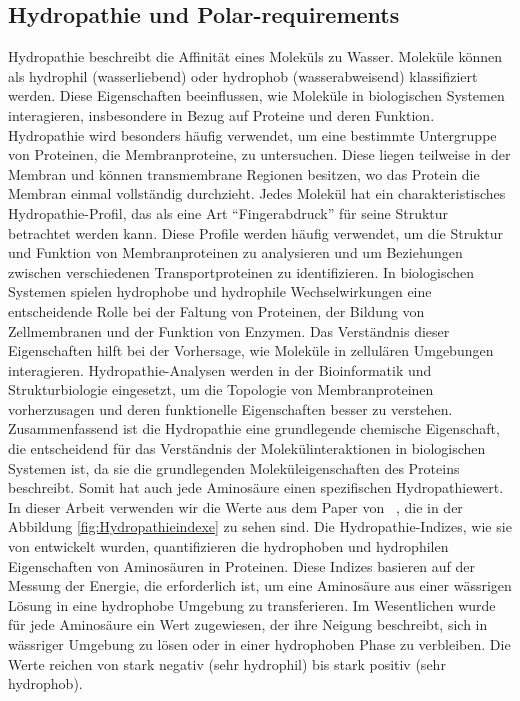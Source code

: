 \documentclass[german,version-2022-01]{uzl-thesis}
\begin{document}
\subsection{Hydropathie und Polar-requirements}
Hydropathie beschreibt die Affinit\"at eines Molek\"uls zu Wasser. Molek\"ule k\"onnen als hydrophil (wasserliebend) oder hydrophob (wasserabweisend) klassifiziert werden. Diese Eigenschaften beeinflussen, wie Molek\"ule in biologischen Systemen interagieren, insbesondere in Bezug auf Proteine und deren Funktion. Hydropathie wird besonders h\"aufig verwendet, um eine bestimmte Untergruppe von Proteinen, die Membranproteine, zu untersuchen. Diese liegen teilweise in der Membran und k\"onnen transmembrane Regionen besitzen, wo das Protein die Membran einmal vollst\"andig durchzieht. Jedes Molek\"ul hat ein charakteristisches Hydropathie-Profil, das als eine Art "`Fingerabdruck"' f\"ur seine Struktur betrachtet werden kann. Diese Profile werden h\"aufig verwendet, um die Struktur und Funktion von Membranproteinen zu analysieren und um Beziehungen zwischen verschiedenen Transportproteinen zu identifizieren. In biologischen Systemen spielen hydrophobe und hydrophile Wechselwirkungen eine entscheidende Rolle bei der Faltung von Proteinen, der Bildung von Zellmembranen und der Funktion von Enzymen. Das Verst\"andnis dieser Eigenschaften hilft bei der Vorhersage, wie Molek\"ule in zellul\"aren Umgebungen interagieren. Hydropathie-Analysen werden in der Bioinformatik und Strukturbiologie eingesetzt, um die Topologie von Membranproteinen vorherzusagen und deren funktionelle Eigenschaften besser zu verstehen. Zusammenfassend ist die Hydropathie eine grundlegende chemische Eigenschaft, die entscheidend f\"ur das Verst\"andnis der Molek\"ulinteraktionen in biologischen Systemen ist, da sie die grundlegenden Molek\"uleigenschaften des Proteins beschreibt. 
Somit hat auch jede Aminos\"aure einen spezifischen Hydropathiewert. In dieser Arbeit verwenden wir die Werte aus dem Paper  von \citeauthor{kyte_simple_1982}~\cite{kyte_simple_1982}, die in der Abbildung \ref{fig:Hydropathieindexe} zu sehen sind. Die Hydropathie-Indizes, wie sie von \citeauthor{kyte_simple_1982} entwickelt wurden, quantifizieren die hydrophoben und hydrophilen Eigenschaften von Aminos\"auren in Proteinen. Diese Indizes basieren auf der Messung der Energie, die erforderlich ist, um eine Aminos\"aure aus einer w\"assrigen L\"osung in eine hydrophobe Umgebung zu transferieren. Im Wesentlichen wurde f\"ur jede Aminos\"aure ein Wert zugewiesen, der ihre Neigung beschreibt, sich in w\"assriger Umgebung zu l\"osen oder in einer hydrophoben Phase zu verbleiben. Die Werte reichen von stark negativ (sehr hydrophil) bis stark positiv (sehr hydrophob).
\end{document}
